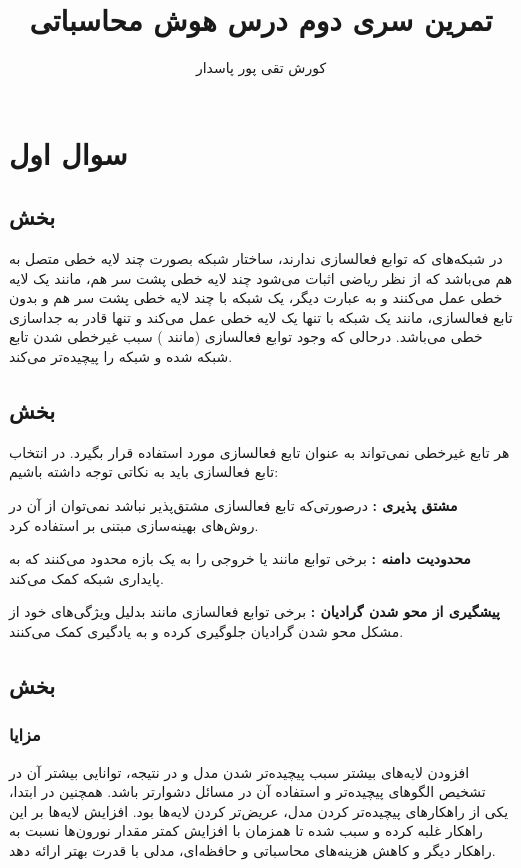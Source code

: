 \documentclass[12pt]{article}
\title{تمرین سری دوم درس هوش محاسباتی}
\author{کورش تقی پور پاسدار 
\lr{400521207}}
\begin{document}
	\maketitle
	\tableofcontents
	\newpage
	\section{سوال اول}
	\subsection{بخش }
	در شبکه‌های  که توابع فعالسازی ندارند، ساختار شبکه بصورت چند لایه خطی متصل به هم می‌باشد که از نظر ریاضی اثبات می‌شود چند لایه خطی پشت سر هم، مانند یک لایه خطی عمل می‌کنند و به عبارت دیگر، یک شبکه با چند لایه خطی پشت سر هم و بدون تابع فعالسازی، مانند یک شبکه با تنها یک لایه خطی عمل می‌کند و تنها قادر به جداسازی خطی می‌باشد. درحالی که وجود توابع فعالسازی (مانند ) سبب غیرخطی شدن تابع شبکه شده و شبکه را پیچیده‌تر می‌کند.
	\subsection{بخش }
	هر تابع غیرخطی نمی‌تواند به عنوان تابع فعالسازی مورد استفاده قرار بگیرد. در انتخاب تابع فعالسازی باید به نکاتی توجه داشته باشیم:
	
	\textbf{مشتق پذیری : }درصورتی‌که تابع فعالسازی مشتق‌پذیر نباشد نمی‌توان از آن در روش‌های بهینه‌سازی مبتنی بر  استفاده کرد.
	
	\textbf{محدودیت دامنه : }برخی توابع مانند یا  خروجی را به یک بازه محدود می‌کنند که به پایداری شبکه کمک می‌کند.
	
	\textbf{پیشگیری از محو شدن گرادیان : }برخی توابع فعالسازی مانند  بدلیل ویژگی‌های خود از  مشکل محو شدن گرادیان جلوگیری کرده و به یادگیری کمک می‌کنند.
	\subsection{بخش }
	\subsubsection{مزایا}
	افزودن لایه‌های بیشتر سبب پیچیده‌تر شدن مدل و در نتیجه، توانایی بیشتر آن در تشخیص الگوهای پیچیده‌تر و استفاده آن در مسائل دشوارتر باشد. همچنین در ابتدا، یکی از راهکار‌های پیچیده‌تر کردن مدل، عریض‌تر کردن لایه‌ها بود. افزایش لایه‌ها بر این راهکار غلبه کرده و سبب شده تا همزمان با افزایش کمتر مقدار نورون‌ها نسبت به راهکار دیگر و کاهش هزینه‌های محاسباتی و حافظه‌ای، مدلی با قدرت بهتر ارائه دهد.
\end{document}
